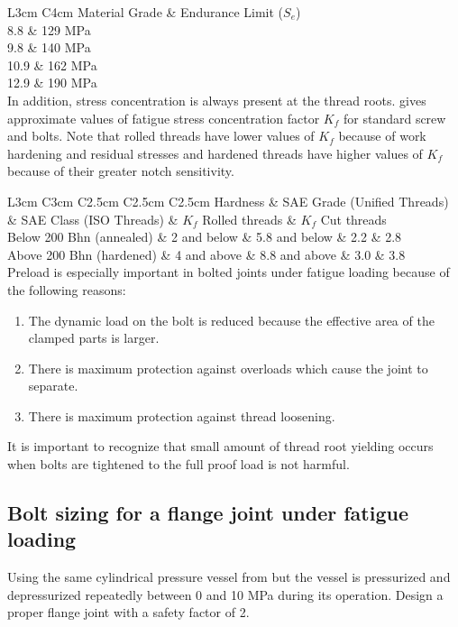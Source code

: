\documentclass[a4paper,openany,12pt]{book}
\begin{document}
{{ L3cm C4cm Material Grade \& Endurance Limit (\(S_e\))\\
8.8 \& 129 MPa\\
9.8 \& 140 MPa\\
10.9 \& 162 MPa\\
12.9 \& 190 MPa\\

In addition, stress concentration is always present at the thread roots.
gives approximate values of fatigue stress concentration factor \(K_f\)
for standard screw and bolts. Note that rolled threads have lower values
of \(K_f\) because of work hardening and residual stresses and hardened
threads have higher values of \(K_f\) because of their greater notch
sensitivity.

 L3cm C3cm C2.5cm C2.5cm C2.5cm Hardness \& SAE Grade (Unified Threads) \&
SAE Class (ISO Threads) \& \(K_f\) Rolled threads \& \(K_f\) Cut threads\\
Below 200 Bhn (annealed) \& 2 and below \& 5.8 and below \& 2.2 \& 2.8\\
Above 200 Bhn (hardened) \& 4 and above \& 8.8 and above \& 3.0 \& 3.8\\

Preload is especially important in bolted joints under fatigue loading
because of the following reasons:

\begin{enumerate}
\item The dynamic load on the bolt is reduced because the effective area of
the clamped parts is larger.

\item There is maximum protection against overloads which cause the joint
to separate.

\item There is maximum protection against thread loosening.
\end{enumerate}

It is important to recognize that small amount of thread root yielding
occurs when bolts are tightened to the full proof load is not harmful.

\subsection{Bolt sizing for a flange joint under fatigue loading}
\label{sec:org3517145}

Using the same cylindrical pressure vessel from
but the vessel is pressurized and depressurized repeatedly between 0 and
10 MPa during its operation. Design a proper flange joint with a safety
factor of 2.

}}
\end{document}
